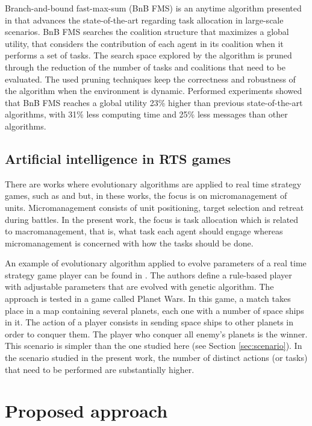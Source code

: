 \documentclass[a4paper]{sbgames}
\begin{document}
Branch-and-bound fast-max-sum (BnB FMS) is an anytime algorithm presented in \cite{Macarthur+2011} that advances the state-of-the-art regarding task allocation in large-scale scenarios. BnB FMS searches the coalition structure that maximizes a global utility, that considers the contribution of each agent in its coalition when it performs a set of tasks. The search space explored by the algorithm is pruned through the reduction of the  number of tasks and coalitions that need to be evaluated. The used pruning techniques keep the correctness and robustness of the algorithm when the environment is dynamic. Performed experiments showed that BnB FMS reaches a global utility 23\% higher than previous state-of-the-art algorithms, with 31\% less computing time and 25\% less messages than other algorithms.

\subsection{Artificial intelligence in RTS games}
\label{sec:related_iagames}

There are works where evolutionary algorithms are applied to real time strategy games, such as \cite{Lin&Ting2011} and \cite{Rathe&Boe2012} but, in these works, the focus is on micromanagement of units. Micromanagement consists of unit positioning, target selection and retreat during battles. In the present work, the focus is task allocation which is related to macromanagement, that is, what task each agent should engage whereas micromanagement is concerned with how the tasks should be done.

An example of evolutionary algorithm applied to evolve parameters of a real time strategy game player can be found in \cite{Fernandez-Ares+2011}. The authors define a rule-based player with adjustable parameters that are evolved with genetic algorithm. The approach is tested in a game called Planet Wars. In this game, a match takes place in a map containing several planets, each one with a number of space ships in it. The action of a player consists in sending space ships to other planets in order to conquer them. The player who conquer all enemy's planets is the winner. This scenario is simpler than the one studied here (see Section \ref{sec:scenario}). In the scenario studied in the present work, the number of distinct actions (or tasks) that need to be performed are substantially higher.



\section{Proposed approach}
\label{sec:approach}
\end{document}
